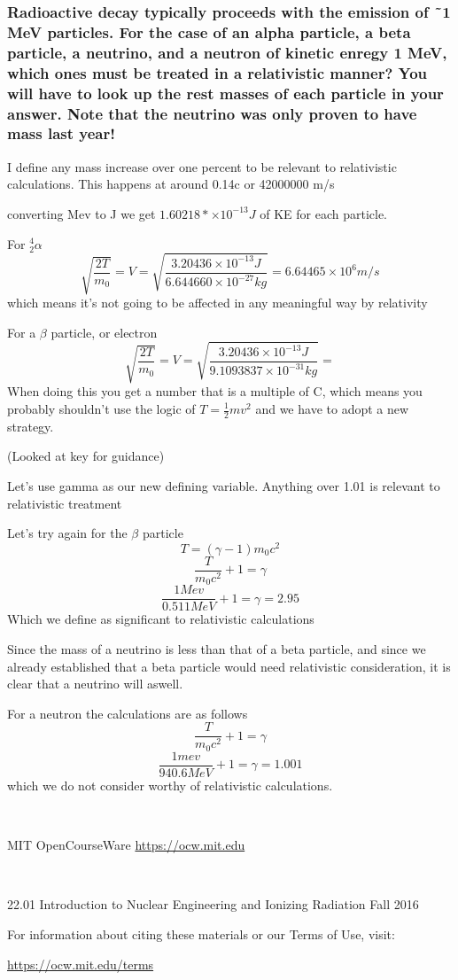 \documentclass{article}
\begin{document}
\subsubsection{Radioactive decay typically proceeds with the emission of ˜1 MeV particles. For the
case of an alpha particle, a beta particle, a neutrino, and a neutron of kinetic enregy
1 MeV, which ones must be treated in a relativistic manner? You will have to look up
the rest masses of each particle in your answer. Note that the neutrino was only proven
to have mass last year!}\vspace{10pt}

I define any mass increase over one percent to be relevant to relativistic calculations. This happens at around 0.14c or 42000000 m/s\vspace{10pt}

converting Mev to J we get $1.60218*\times10^{-13}J$ of KE for each particle.\vspace{10pt}

For $^4_2\alpha$ $$\sqrt{\frac{2T}{m_0}}=V= \sqrt{\frac{3.20436\times10^{-13}J}{6.644660\times10^{-27}kg}}=6.64465\times10^6m/s$$ which means it's not going to be affected in any meaningful way by relativity\vspace{10pt}

For a $\beta$ particle, or electron $$\sqrt{\frac{2T}{m_0}}=V= \sqrt{\frac{3.20436\times10^{-13}J}{9.1093837\times10^{-31}kg}}=$$ When doing this you get a number that is a multiple of C, which means you probably shouldn't use the logic of $T=\frac{1}{2}mv^2$ and we have to adopt a new strategy.\vspace{10pt}

(Looked at key for guidance)\vspace{5pt}

Let's use gamma as our new defining variable. Anything over 1.01 is relevant to relativistic treatment


Let's try again for the $\beta$ particle
$$T=(\gamma-1)m_0c^2$$
$$\frac{T}{m_0c^2}+1=\gamma$$
$$\frac{1Mev}{0.511MeV}+1=\gamma=2.95$$ Which we define as significant to relativistic calculations\vspace{10pt}


Since the mass of a neutrino is less than that of a beta particle, and since we already established that a beta particle would need relativistic consideration, it is clear that a neutrino will aswell.\vspace{10pt}


For a neutron the calculations are as follows
$$\frac{T}{m_0c^2}+1=\gamma$$
$$\frac{1mev}{940.6MeV}+1=\gamma=1.001$$ which we do not consider worthy of relativistic calculations.




\
\
\

MIT OpenCourseWare
\href{https://ocw.mit.edu}{https://ocw.mit.edu}

\

22.01 Introduction to Nuclear Engineering and Ionizing Radiation
Fall 2016


For information about citing these materials or our Terms of Use, visit: 

\href{https://ocw.mit.edu/terms}{https://ocw.mit.edu/terms}
\end{document}
